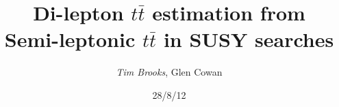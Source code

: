\documentclass{beamer}
\title[Dilepton $t \bar{t}$ estimation\hspace{14em}\insertframenumber/5]{Di-lepton $t \bar{t}$ estimation from \\ Semi-leptonic $t \bar{t}$ in SUSY searches}
\author{\emph{Tim Brooks}, Glen Cowan}
\institute{Royal Holloway University of London}
\date{28/8/12}
\begin{document}
\begin{frame}
\titlepage
\end{frame}



%
%

%
%
\end{document}
